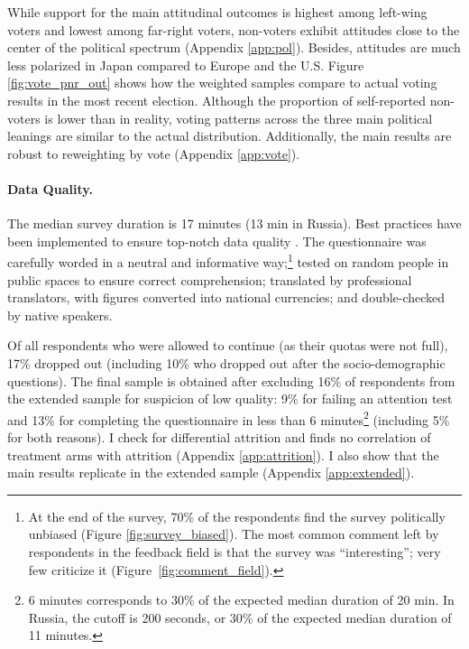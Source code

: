 \documentclass[12pt,english]{article}
\begin{document}
\begin{bibunit}
While support for the main attitudinal outcomes 
is highest among left-wing voters and lowest among far-right voters, non-voters exhibit attitudes close to the center of the political spectrum (Appendix \ref{app:pol}). Besides, attitudes are much less polarized in Japan compared to Europe and the U.S. 
Figure \ref{fig:vote_pnr_out} shows 
how the weighted samples compare to actual voting results in the most recent election. 
Although the proportion of self-reported non-voters is lower than in reality, voting patterns across the three main political leanings are similar to the actual distribution. 
Additionally, the main results are robust to reweighting by vote (Appendix \ref{app:vote}). 


\paragraph{Data Quality.}\label{par:data_quality}
The median survey duration is 17 minutes (13 min in Russia). 
Best practices have been implemented  to ensure top-notch data quality \citep{stantcheva_how_2023}. 
The questionnaire was carefully worded in a neutral and informative way;\footnote{At the end of the survey, 70\% of the respondents find the survey politically unbiased (Figure \ref{fig:survey_biased}). The most common comment left by respondents in the feedback field is that the survey was ``interesting''; very few criticize it (Figure~\ref{fig:comment_field}).} tested on random people in public spaces to ensure correct comprehension; translated by professional translators, with figures converted into national currencies; and double-checked by native speakers.

Of all respondents who %
were allowed to continue (as their quotas were not full), %
17\% dropped out (including 10\% who dropped out after the socio-demographic questions). The final sample is obtained after excluding 16\% of respondents from the extended sample for suspicion of low quality: 9\% for failing an attention test and 13\% for completing the questionnaire in less than 6 minutes\footnote{6 minutes corresponds to 30\% of the expected median duration of 20 min. In Russia, the cutoff is 200 seconds, or 30\% of the expected median duration of 11 minutes.} (including 5\% for both reasons). 
I check for differential attrition and finds no correlation of treatment arms with attrition (Appendix \ref{app:attrition}). I also show that the main results replicate in the extended sample (Appendix \ref{app:extended}). 


\end{bibunit}
\end{document}
